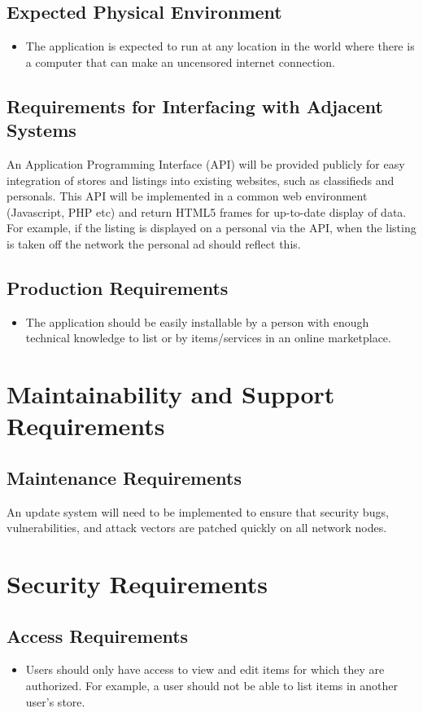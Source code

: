\documentclass{article}
\begin{document}
\subsection{Expected Physical Environment}
\begin{itemize}
        \item 
        The application is expected to run at any location in the world where there is a computer that can make an uncensored internet connection.
\end{itemize}
\subsection{Requirements for Interfacing with Adjacent Systems}
An Application Programming Interface (API) will be provided publicly for easy integration of stores and listings into existing websites, such as classifieds and personals. This API will be implemented in a common web environment (Javascript, PHP etc) and return HTML5 frames for up-to-date display of data. For example, if the listing is displayed on a personal via the API, when the listing is taken off the network the personal ad should reflect this.
\subsection{Production Requirements}
\begin{itemize}
        \item 
        The application should be easily installable by a person with enough technical knowledge to list or by items/services in an online marketplace.
\end{itemize}
\section{Maintainability and Support Requirements}
\subsection{Maintenance Requirements}
An update system will need to be implemented to ensure that security bugs, vulnerabilities, and attack vectors are patched quickly on all network nodes. 
\section{Security Requirements}
\subsection{Access Requirements}
\begin{itemize}
        \item 
        Users should only have access to view and edit items for which they are authorized. For example, a user should not be able to list items in another user's store.       
\end{itemize}
\end{document}
